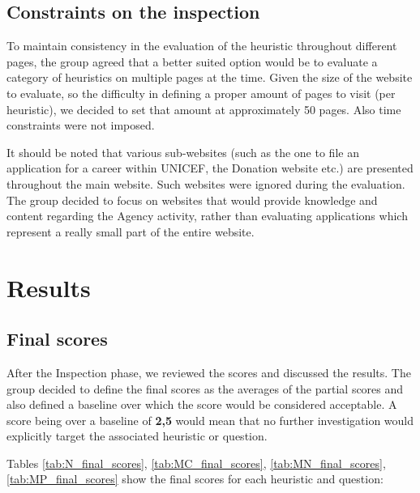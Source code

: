 \subsection{Constraints on the inspection}
To maintain consistency in the evaluation of the heuristic throughout different pages, the group agreed that a better suited option would be to evaluate a category of heuristics on multiple pages at the time. Given the size of the website to evaluate, so the difficulty in defining a proper amount of pages to visit (per heuristic), we decided to set that amount at approximately 50 pages. Also time constraints were not imposed.

It should be noted that various sub-websites (such as the one to file an application for a career within UNICEF, the Donation website etc.) are presented throughout the main website. Such websites were ignored during the evaluation. The group decided to focus on websites that would provide knowledge and content regarding the Agency activity, rather than evaluating applications which represent a really small part of the entire website.

\pagebreak

\section{Results}
\subsection{Final scores}
After the Inspection phase, we reviewed the scores and discussed the results. The group decided to define the final scores as the averages of the partial scores and also defined a baseline over which the score would be considered acceptable. A score being over a baseline of \textbf{2,5} would mean that no further investigation would explicitly target the associated heuristic or question.

Tables \ref{tab:N_final_scores}, \ref{tab:MC_final_scores}, \ref{tab:MN_final_scores}, \ref{tab:MP_final_scores} show the final scores for each heuristic and question:


